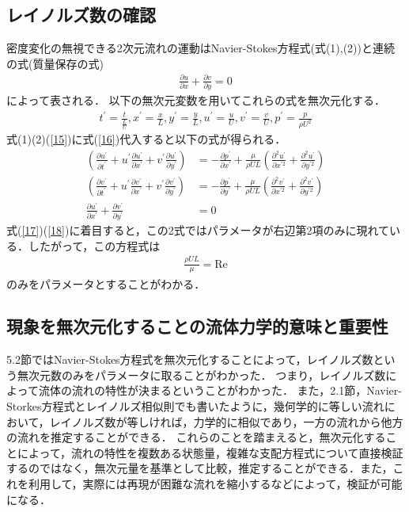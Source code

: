 \documentclass[a4paper,11pt,uplatex]{jsarticle}
\begin{document}
\subsection{レイノルズ数の確認}
密度変化の無視できる2次元流れの運動はNavier-Stokes方程式(式(1),(2))と連続の式(質量保存の式)
\begin{align}
  \label{15}
  \frac{\partial u}{\partial x} + \frac{\partial v}{\partial y} = 0
\end{align}
によって表される．
以下の無次元変数を用いてこれらの式を無次元化する．
\begin{align}
  \label{16}
  t^{\prime} = \frac{t}{\frac{L}{U}},x^{\prime} = \frac{x}{L}, y^{\prime} = \frac{y}{L}, u^{\prime} = \frac{u}{U}, v^{\prime} = \frac{v}{U}, p^{\prime} = \frac{p}{\rho U^2}
\end{align}
式(1)(2)(\ref{15})に式(\ref{16})代入すると以下の式が得られる．
\begin{align}
  \label{17}
  \left( \frac{\partial u^{\prime}}{\partial t^{\prime}} + u^{\prime}\frac{\partial u^{\prime}}{\partial x^{\prime}} + v^{\prime}\frac{\partial u^{\prime}}{\partial y^{\prime}} \right) &= -\frac{\partial p^{\prime}}{\partial x^{\prime}} + \frac{\mu}{\rho UL} \left( \frac{\partial^2 u^{\prime}}{\partial x^{\prime 2}} + \frac{\partial^2 u^{\prime}}{\partial y^{\prime 2}} \right) \\
  \label{18}
  \left( \frac{\partial v^{\prime}}{\partial t^{\prime}} + u^{\prime}\frac{\partial v^{\prime}}{\partial x^{\prime}} + v^{\prime}\frac{\partial v^{\prime}}{\partial y^{\prime}} \right) &= -\frac{\partial p^{\prime}}{\partial y^{\prime}} + \frac{\mu}{\rho UL} \left( \frac{\partial^2 v^{\prime}}{\partial x^{\prime 2}} + \frac{\partial^2 v^{\prime}}{\partial y^{\prime 2}} \right) \\
  \frac{\partial u^{\prime}}{\partial x^{\prime}} + \frac{\partial v^{\prime}}{\partial y^{\prime}} &= 0
\end{align}
式(\ref{17})(\ref{18})に着目すると，この2式ではパラメータが右辺第2項のみに現れている．したがって，この方程式は
\begin{align}
  \frac{\rho UL}{\mu} = \mathrm{Re}
\end{align}
のみをパラメータとすることがわかる．

\subsection{現象を無次元化することの流体力学的意味と重要性}
5.2節ではNavier-Stokes方程式を無次元化することによって，レイノルズ数という無次元数のみをパラメータに取ることがわかった．
つまり，レイノルズ数によって流体の流れの特性が決まるということがわかった．
また，2.1節，Navier-Storkes方程式とレイノルズ相似則でも書いたように，幾何学的に等しい流れにおいて，レイノルズ数が等しければ，力学的に相似であり，一方の流れから他方の流れを推定することができる．
これらのことを踏まえると，無次元化することによって，流れの特性を複数ある状態量，複雑な支配方程式について直接検証するのではなく，無次元量を基準として比較，推定することができる．また，これを利用して，実際には再現が困難な流れを縮小するなどによって，検証が可能になる．
\end{document}
